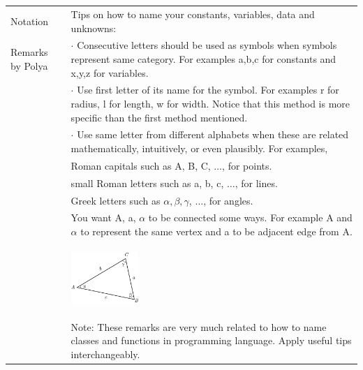 \documentclass[10pt]{article}
\begin{document}
\\\\
\begin{tabular}{p{3cm} p{13cm}}
Notation \hspace{2cm} & Tips on how to name your constants, variables, data and unknowns: \\
 Remarks by Polya & $\cdot$ Consecutive letters should be used as symbols when symbols represent same category. For examples a,b,c for constants and x,y,z for variables. \\
& 
$\cdot$ Use first letter of its name for the symbol. For examples r for radius, l for length, w for width. Notice that this method is more specific than the first method mentioned.\\ 
& $\cdot$ Use same letter from different alphabets when these are related mathematically, intuitively, or even plausibly. For examples,\\
& \hspace{1cm} Roman capitals such as A, B, C, $\ldots$, for points.\\
& \hspace{1cm} small Roman letters such as a, b, c, $\ldots$, for lines.\\
 & \hspace{1cm} Greek letters such as $\alpha, \beta, \gamma$, $\ldots$, for angles.\\
 & \hspace{1cm} You want A, a, $\alpha$ to be connected some ways. For example A and $\alpha$ to represent the same vertex and a to be adjacent edge from A.\\
 & \begin{center} \includegraphics[width=1in]{Capture5.jpg} \end{center}\\
 & Note: These remarks are very much related to how to name classes and functions in programming language. Apply useful tips interchangeably.\\
   
\end{tabular}
\end{document}
